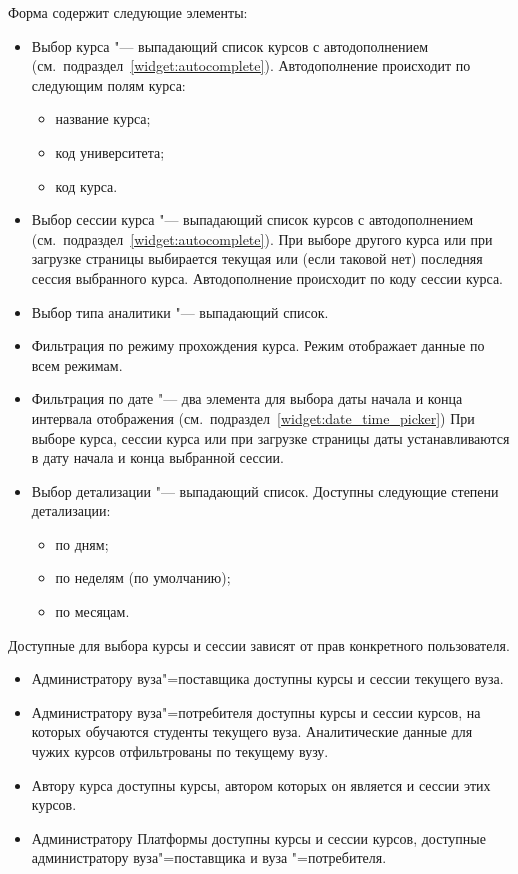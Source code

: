 Форма содержит следующие элементы:
\begin{itemize}
	\item Выбор курса "--- выпадающий список курсов с автодополнением (см.\ подраздел~\ref{widget:autocomplete}).
	Автодополнение происходит по следующим полям курса:
	\begin{itemize}
	 	\item название курса;
	 	\item код университета;
	 	\item код курса.
	 \end{itemize}
	\item Выбор сессии курса "--- выпадающий список курсов с автодополнением (см.\ подраздел~\ref{widget:autocomplete}).
	При выборе другого курса или при загрузке страницы выбирается текущая или (если таковой нет) последняя
	сессия выбранного курса. Автодополнение происходит по коду сессии курса.
	\item Выбор типа аналитики "--- выпадающий список.
	\item Фильтрация по режиму прохождения курса. Режим  отображает данные по всем режимам.
	\item Фильтрация по дате "--- два элемента для выбора даты начала и конца интервала отображения (см.\ подраздел~\ref{widget:date_time_picker})
	При выборе курса, сессии курса или при загрузке страницы даты устанавливаются в дату начала и конца выбранной сессии.
	\item Выбор детализации "--- выпадающий список. Доступны следующие степени детализации:
	\begin{itemize}
		\item по дням;
		\item по неделям (по умолчанию);
		\item по месяцам.
	\end{itemize}
\end{itemize}

Доступные для выбора курсы и сессии зависят от прав конкретного пользователя.
\begin{itemize}
	\item Администратору вуза"=поставщика доступны курсы и сессии текущего вуза.
	\item Администратору вуза"=потребителя доступны курсы и сессии курсов, на которых 
	обучаются студенты текущего вуза. Аналитические данные для чужих курсов отфильтрованы по текущему вузу.
	\item Автору курса доступны курсы, автором которых он является и сессии этих курсов.
	\item Администратору Платформы доступны курсы и сессии курсов, доступные администратору вуза"=поставщика
	и вуза "=потребителя.
\end{itemize}


